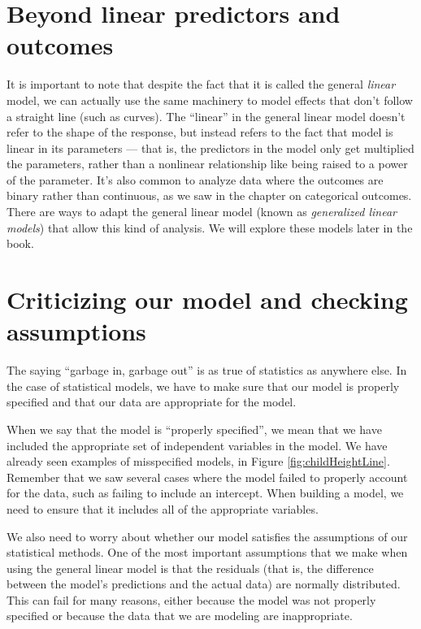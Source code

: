 \documentclass[
  12pt,
]{book}
\begin{document}
\hypertarget{beyond-linear-predictors-and-outcomes}{%
\section{Beyond linear predictors and outcomes}\label{beyond-linear-predictors-and-outcomes}}

It is important to note that despite the fact that it is called the general \emph{linear} model, we can actually use the same machinery to model effects that don't follow a straight line (such as curves). The ``linear'' in the general linear model doesn't refer to the shape of the response, but instead refers to the fact that model is linear in its parameters --- that is, the predictors in the model only get multiplied the parameters, rather than a nonlinear relationship like being raised to a power of the parameter. It's also common to analyze data where the outcomes are binary rather than continuous, as we saw in the chapter on categorical outcomes. There are ways to adapt the general linear model (known as \emph{generalized linear models}) that allow this kind of analysis. We will explore these models later in the book.

\hypertarget{model-criticism}{%
\section{Criticizing our model and checking assumptions}\label{model-criticism}}

The saying ``garbage in, garbage out'' is as true of statistics as anywhere else. In the case of statistical models, we have to make sure that our model is properly specified and that our data are appropriate for the model.

When we say that the model is ``properly specified'', we mean that we have included the appropriate set of independent variables in the model. We have already seen examples of misspecified models, in Figure \ref{fig:childHeightLine}. Remember that we saw several cases where the model failed to properly account for the data, such as failing to include an intercept. When building a model, we need to ensure that it includes all of the appropriate variables.

We also need to worry about whether our model satisfies the assumptions of our statistical methods. One of the most important assumptions that we make when using the general linear model is that the residuals (that is, the difference between the model's predictions and the actual data) are normally distributed. This can fail for many reasons, either because the model was not properly specified or because the data that we are modeling are inappropriate.
\end{document}
